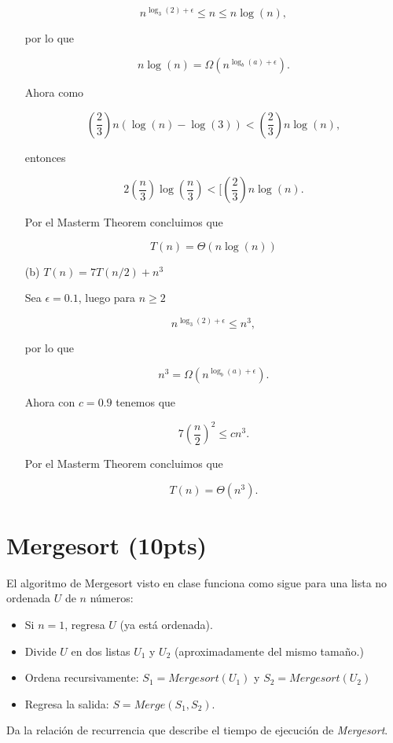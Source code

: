 \documentclass[answers,11pt]{exam}
\begin{document}
\begin{questions}
\begin{itemize}
\[n^{\log_3(2) + \epsilon} \leq n \leq n\log(n),\]

por lo que

\[n\log(n) = \Omega(n^{\log_b(a) + \epsilon}).\]

Ahora como

\[\left(\frac{2}{3}\right)n(\log(n) - \log(3)) < \left(\frac{2}{3}\right) n \log(n),\]

entonces

\[2\left(\frac{n}{3}\right)\log\left(\frac{n}{3}\right) < [\left(\frac{2}{3}\right)n \log(n).\]

Por el Masterm Theorem concluimos que

\[T(n) = \Theta(n\log(n))\]

\item[(b)]{$T(n) = 7T(n/2) + n^3$}

Sea $\epsilon = 0.1$, luego para $n \geq 2$

\[n^{\log_3(2) + \epsilon} \leq n^3,\]

por lo que

\[n^3 = \Omega(n^{\log_b(a) + \epsilon}).\]

Ahora con $c=0.9$ tenemos que

\[7\left(\frac{n}{2}\right)^2 \leq cn^3.\]

Por el Masterm Theorem concluimos que

\[T(n) = \Theta(n^3).\]

\end{itemize}

\section*{\sf Mergesort (10pts)}


El algoritmo de Mergesort visto en clase funciona como sigue para una lista no ordenada $U$ de $n$ n\'umeros:\\

\begin{itemize}
\item{Si $n=1$, regresa $U$ (ya est\'a ordenada).}
\item{Divide $U$ en dos listas $U_1$ y $U_2$ (aproximadamente del mismo tama\~no.)}
\item{Ordena recursivamente: $S_1 = Mergesort(U_1)$ y $S_2 = Mergesort(U_2)$}
\item{Regresa la salida: $S = Merge(S_1,S_2)$.}
\end{itemize}


\question 
Da la relaci\'on de recurrencia que describe el tiempo de ejecuci\'on de \emph{Mergesort}.


\end{questions}
\end{document}
